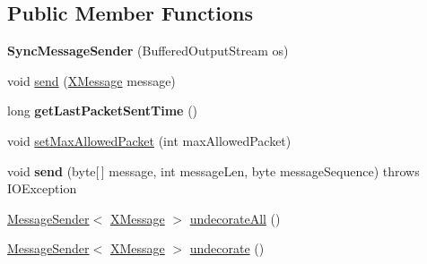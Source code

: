 \subsection*{Public Member Functions}
\begin{DoxyCompactItemize}
\item 
\mbox{\label{classcom_1_1mysql_1_1cj_1_1protocol_1_1x_1_1_sync_message_sender_a166b97eef951d91fcd64f0db3db5fbce}} 
{\bfseries Sync\+Message\+Sender} (Buffered\+Output\+Stream os)
\item 
void \mbox{\hyperlink{classcom_1_1mysql_1_1cj_1_1protocol_1_1x_1_1_sync_message_sender_af1f0d9d9427519379b24b2fb991d4ea7}{send}} (\mbox{\hyperlink{classcom_1_1mysql_1_1cj_1_1protocol_1_1x_1_1_x_message}{X\+Message}} message)
\item 
\mbox{\label{classcom_1_1mysql_1_1cj_1_1protocol_1_1x_1_1_sync_message_sender_a43022535ec5a2b7c1ac10cf339009439}} 
long {\bfseries get\+Last\+Packet\+Sent\+Time} ()
\item 
void \mbox{\hyperlink{classcom_1_1mysql_1_1cj_1_1protocol_1_1x_1_1_sync_message_sender_aa403c14cdcc078b9250830c85f6dbbf9}{set\+Max\+Allowed\+Packet}} (int max\+Allowed\+Packet)
\item 
\mbox{\label{classcom_1_1mysql_1_1cj_1_1protocol_1_1x_1_1_sync_message_sender_a3fdd323d523578fb3c30b25eda718c0c}} 
void {\bfseries send} (byte\mbox{[}$\,$\mbox{]} message, int message\+Len, byte message\+Sequence)  throws I\+O\+Exception 
\item 
\mbox{\hyperlink{interfacecom_1_1mysql_1_1cj_1_1protocol_1_1_message_sender}{Message\+Sender}}$<$ \mbox{\hyperlink{classcom_1_1mysql_1_1cj_1_1protocol_1_1x_1_1_x_message}{X\+Message}} $>$ \mbox{\hyperlink{classcom_1_1mysql_1_1cj_1_1protocol_1_1x_1_1_sync_message_sender_a7228daf021acf6d8505108645317825d}{undecorate\+All}} ()
\item 
\mbox{\hyperlink{interfacecom_1_1mysql_1_1cj_1_1protocol_1_1_message_sender}{Message\+Sender}}$<$ \mbox{\hyperlink{classcom_1_1mysql_1_1cj_1_1protocol_1_1x_1_1_x_message}{X\+Message}} $>$ \mbox{\hyperlink{classcom_1_1mysql_1_1cj_1_1protocol_1_1x_1_1_sync_message_sender_aa8fd388e5d4e5e86cb35add7f6e45c7b}{undecorate}} ()
\end{DoxyCompactItemize}


